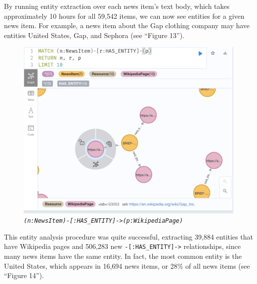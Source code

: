 \documentclass[11pt]{article}
\begin{document}
  By running entity extraction over each news item's text body, which takes approximately 10 hours for all 59,542 items, we can now see entities for a given news item. For example, a news item about the Gap clothing company may have entities United States, Gap, and Sephora (see ``Figure 13'').

  \begin{figure}
    \centerline{\includegraphics[scale=0.5]{has-entity.png}}
    \caption{\textit{\lstinline{(n:NewsItem)-[:HAS_ENTITY]->(p:WikipediaPage)}}}
  \end{figure}

  This entity analysis procedure was quite successful, extracting 39,884 entities that have Wikipedia pages and 506,283 new \lstinline{-[:HAS_ENTITY]->} relationships, since many news items have the same entity. In fact, the most common entity is the United States, which appears in 16,694 news items, or 28\% of all news items (see ``Figure 14'').  
\end{document}
